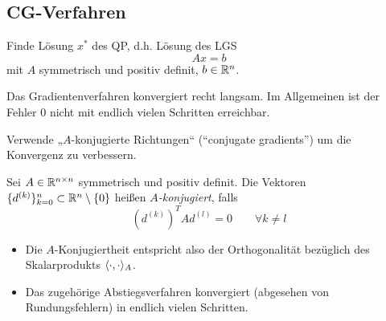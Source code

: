 \documentclass[
]{mycourse}
\begin{document}
\subsection{CG-Verfahren}


Finde Lösung $x^*$ des QP, d.h. Lösung des LGS
\[
	Ax = b
\]
mit $A$ symmetrisch und positiv definit, $b \in \mathbb{R}^n$.

Das Gradientenverfahren konvergiert recht langsam.
Im Allgemeinen ist der Fehler $0$ nicht mit endlich vielen Schritten erreichbar.

Verwende „$A$-konjugierte Richtungen“ (“conjugate gradients”) um die Konvergenz zu verbessern.

\begin{df} \label{4.16}
	Sei $A \in \mathbb{R}^{n\times n}$ symmetrisch und positiv definit.
	Die Vektoren $\{d^{(k)}\}_{k=0}^n \subset \mathbb{R}^n \setminus \{0\}$ heißen \emph{$A$-konjugiert}, falls
	\[
		(d^{(k)})^T A d^{(l)} = 0
		\qquad 
		\forall k \neq l
	\]
	\begin{note}
		\begin{itemize}
			\item
				Die $A$-Konjugiertheit entspricht also der Orthogonalität bezüglich des Skalarprodukts $\langle\cdot, \cdot\rangle_A$.
			\item
				Das zugehörige Abstiegsverfahren konvergiert (abgesehen von Rundungsfehlern) in endlich vielen Schritten.

		\end{itemize}
	\end{note}
\end{df}
\end{document}
